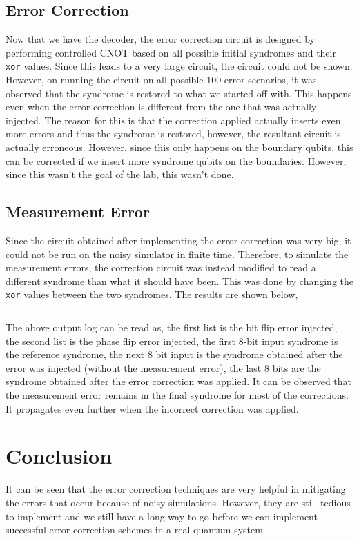 \documentclass[11pt]{article}
\begin{document}
\subsection{Error Correction}
Now that we have the decoder, the error correction circuit is designed by performing controlled CNOT based on all possible initial syndromes and their \texttt{xor} values. Since this leads to a very large circuit, the circuit could not be shown. However, on running the circuit on all possible $100$ error scenarios, it was observed that the syndrome is restored to what we started off with. This happens even when the error correction is different from the one that was actually injected. The reason for this is that the correction applied actually inserts even more errors and thus the syndrome is restored, however, the resultant circuit is actually erroneous. However, since this only happens on the boundary qubits, this can be corrected if we insert more syndrome qubits on the boundaries. However, since this wasn't the goal of the lab, this wasn't done.

\subsection{Measurement Error}
Since the circuit obtained after implementing the error correction was very big, it could not be run on the noisy simulator in finite time. Therefore, to simulate the measurement errors, the correction circuit was instead modified to read a different syndrome than what it should have been. This was done by changing the \texttt{xor} values between the two syndromes. The results are shown below,
\inputminted{python}{outputs/surface_code_measure}

The above output log can be read as, the first list is the bit flip error injected, the second list is the phase flip error injected, the first $8$-bit input syndrome is the reference syndrome, the next $8$ bit input is the syndrome obtained after the error was injected (without the measurement error), the last $8$ bits are the syndrome obtained after the error correction was applied. It can be observed that the measurement error remains in the final syndrome for most of the corrections. It propagates even further when the incorrect correction was applied.

\section{Conclusion}
It can be seen that the error correction techniques are very helpful in mitigating the errors that occur because of noisy simulations. However, they are still tedious to implement and we still have a long way to go before we can implement successful error correction schemes in a real quantum system.
\end{document}
